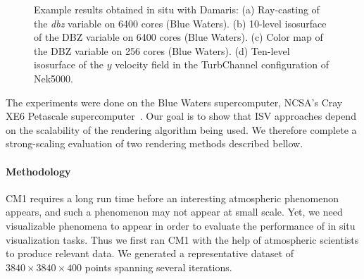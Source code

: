 \begin{figure}[t]
\centering
	\quad
	
	\quad
	
	\caption[Example of visualizations from the CM1 and Nek5000 simulations]{Example results obtained in situ with Damaris:
	(a) Ray-casting of the \emph{dbz} variable on 6400 cores (Blue Waters).
	(b) 10-level isosurface of the DBZ variable on 6400 cores (Blue Waters).
	(c) Color map of the DBZ variable on 256 cores (Blue Waters).
	(d) Ten-level isosurface of the $y$ velocity field in 
	the TurbChannel configuration of Nek5000.}\label{fig:visualresults}
\end{figure}

The experiments were done on the Blue Waters supercomputer, NCSA's Cray XE6 
Petascale supercomputer~\cite{bluewaters}.
Our goal is to show that ISV approaches depend on the scalability of the rendering algorithm 
being used. We therefore complete a strong-scaling evaluation of two 
rendering methods described bellow.

\paragraph{Methodology}
CM1 requires a long run time before an interesting atmospheric phenomenon appears,
and such a phenomenon may not appear at small scale. Yet, we need visualizable
phenomena to appear in order to evaluate the performance of in situ visualization tasks.
Thus we first ran CM1 with the help of atmospheric
scientists to produce relevant data. We generated a representative dataset of 
$3840 \times 3840 \times 400$ points spanning several iterations.

